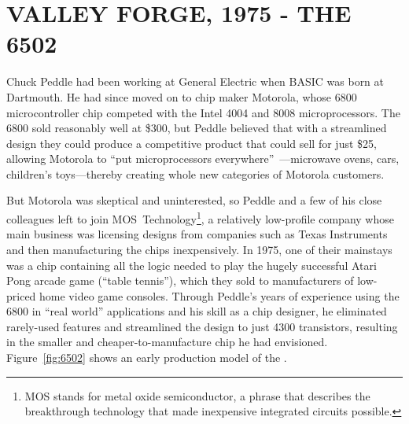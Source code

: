 
\section{VALLEY FORGE, 1975 - THE 6502}


Chuck Peddle had been working at General Electric when BASIC was
born at Dartmouth.  He had since moved on to chip maker Motorola, whose 6800
microcontroller chip competed with the Intel 4004 and
8008 microprocessors.  The 6800 sold reasonably well at \$300, but
Peddle  believed that with a streamlined design they could
produce a competitive product that could sell for just \$25,
allowing Motorola to ``put
microprocessors everywhere''~\cite[p. 31]{commodore}---microwave ovens,
cars, children's toys---thereby creating whole new categories of Motorola customers.

But Motorola was skeptical and uninterested, so Peddle and a few of
his close colleagues left to join MOS~Technology\footnote{MOS stands
for metal oxide semiconductor, a phrase that describes the
breakthrough technology that made inexpensive integrated circuits
possible.}, a relatively low-profile company whose main business was
licensing designs from companies such as Texas Instruments and then
manufacturing the chips inexpensively.
In 1975, one of their mainstays was a chip containing all the logic
needed to play the hugely successful Atari Pong arcade game (``table
tennis''), which they sold to manufacturers of low-priced home video
game consoles.
Through Peddle's years of experience using the 6800 in ``real world''
applications and his skill as a chip designer, he eliminated
rarely-used features and streamlined the design to just 4300
transistors, resulting in the smaller and cheaper-to-manufacture chip
he had envisioned.
Figure~\ref{fig:6502} shows an early production model of the .

